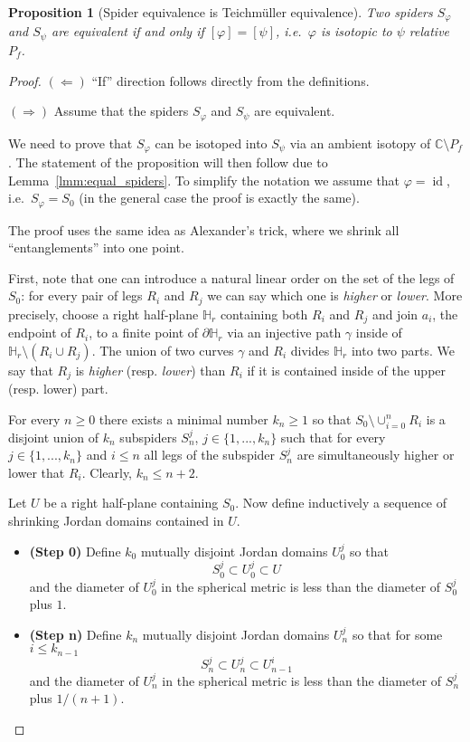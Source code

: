 \documentclass[10pt,reqno,a4paper]{amsart}
\numberwithin{figure}{section}
\numberwithin{equation}{section}
\newtheorem{prp}[thm]{Proposition}
\newcommand{\id}{\operatorname{id}}
\begin{document}
\begin{prp}[Spider equivalence is Teichm\"uller equivalence]
	\label{prp:spiders_define_teich_point}
	Two spiders $S_\varphi$ and $S_\psi$ are equivalent if and only if $[\varphi]=[\psi]$, i.e.\ $\varphi$ is isotopic to $\psi$ relative ${P_f}$.
\end{prp}
\begin{proof}	
	$(\Leftarrow)$ ``If'' direction follows directly from the definitions.
	
	$(\Rightarrow)$ Assume that the spiders $S_\varphi$ and $S_\psi$ are equivalent.
	
	We need to prove that $S_\varphi$ can be isotoped into $S_\psi$ via an ambient isotopy of $\mathbb{C}\setminus P_f$. The statement of the proposition will then follow due to Lemma~\ref{lmm:equal_spiders}. To simplify the notation we assume that $\varphi=\id$, i.e.\ $S_\varphi=S_0$ (in the general case the proof is exactly the same). 
	
	The proof uses the same idea as Alexander's trick, where we shrink all ``entanglements'' into one point.
	
	First, note that one can introduce a natural linear order on the set of the legs of $S_0$: for every pair of legs $R_i$ and $R_j$ we can say which one is \emph{higher} or \emph{lower}. More precisely, choose a right half-plane $\mathbb{H}_r$ containing both $R_i$ and $R_j$ and join $a_i$, the endpoint of $R_i$, to a finite point of $\partial\mathbb{H}_r$ via an injective path $\gamma$ inside of $\mathbb{H}_r\setminus(R_i\cup R_j)$. The union of two curves $\gamma$ and $R_i$ divides $\mathbb{H}_r$ into two parts. We say that $R_j$ is \emph{higher} (resp. \emph{lower}) than $R_i$ if it is contained inside of the upper (resp. lower) part. 
	
	For every $n\geq 0$ there exists a minimal number $k_n\geq 1$ so that $S_0\setminus\cup_{i=0}^n R_i$ is a disjoint union of $k_n$ subspiders $S_n^j$, $j\in\{1,...,k_n\}$ such that for every $j\in\{1,...,k_n\}$ and $i\leq n$ all legs of the subspider $S_n^j$ are simultaneously higher or lower that $R_i$. Clearly, $k_n\leq n+2$.
	
	Let $U$ be a right half-plane containing $S_0$. Now define inductively a sequence of shrinking Jordan domains contained in $U$.
	\begin{itemize}
		\item \textbf{(Step 0)} Define $k_0$ mutually disjoint Jordan domains $U_0^j$ so that
		$$S_0^j\subset U_0^j\subset U$$
		and the diameter of $U_0^j$ in the spherical metric is less than the diameter of $S_0^j$ plus $1$.
		\item \textbf{(Step n)} Define $k_n$ mutually disjoint Jordan domains $U_n^j$ so that for some $i\leq k_{n-1}$
		$$S_n^j\subset U_n^j\subset U_{n-1}^i$$
		and the diameter of $U_n^j$ in the spherical metric is less than the diameter of $S_n^j$ plus $1/(n+1)$.
	\end{itemize}	
	

\end{proof}
\end{document}

